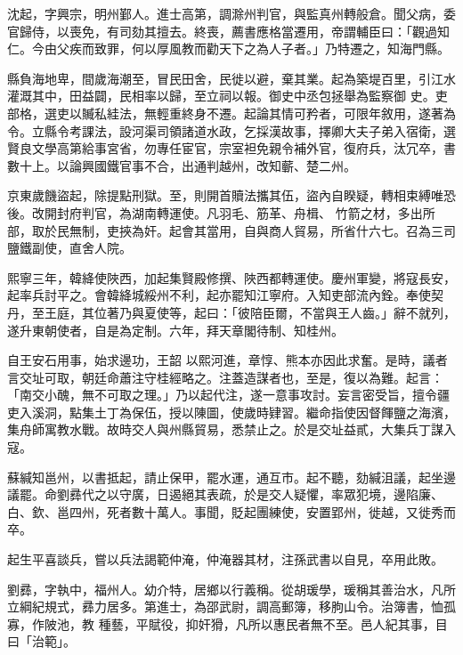 \begin{pinyinscope}
 沈起，字興宗，明州鄞人。進士高第，調滁州判官，與監真州轉般倉。聞父病，委官歸侍，以喪免，有司劾其擅去。終喪，薦書應格當遷用，帝謂輔臣曰：「觀過知仁。今由父疾而致罪，何以厚風教而勸天下之為人子者。」乃特遷之，知海門縣。



 縣負海地卑，間歲海潮至，冒民田舍，民徙以避，棄其業。起為築堤百里，引江水灌溉其中，田益闢，民相率以歸，至立祠以報。御史中丞包拯舉為監察御
 史。吏部格，選吏以贓私絓法，無輕重終身不遷。起論其情可矜者，可限年敘用，遂著為令。立縣令考課法，設河渠司領諸道水政，乞採漢故事，擇卿大夫子弟入宿衛，選賢良文學高第給事宮省，勿專任宦官，宗室袒免親令補外官，復府兵，汰冗卒，書數十上。以論興國鐵官事不合，出通判越州，改知蘄、楚二州。



 京東歲饑盜起，除提點刑獄。至，則開首贖法攜其伍，盜內自睽疑，轉相束縛唯恐後。改開封府判官，為湖南轉運使。凡羽毛、筋革、舟楫、
 竹箭之材，多出所部，取於民無制，吏挾為奸。起會其當用，自與商人貿易，所省什六七。召為三司鹽鐵副使，直舍人院。



 熙寧三年，韓絳使陜西，加起集賢殿修撰、陜西都轉運使。慶州軍變，將寇長安，起率兵討平之。會韓絳城綏州不利，起亦罷知江寧府。入知吏部流內銓。奉使契丹，至王庭，其位著乃與夏使等，起曰：「彼陪臣爾，不當與王人齒。」辭不就列，遂升東朝使者，自是為定制。六年，拜天章閣待制、知桂州。



 自王安石用事，始求邊功，王韶
 以熙河進，章惇、熊本亦因此求奮。是時，議者言交址可取，朝廷命蕭注守桂經略之。注蓋造謀者也，至是，復以為難。起言：「南交小醜，無不可取之理。」乃以起代注，遂一意事攻討。妄言密受旨，擅令疆吏入溪洞，點集土丁為保伍，授以陳圖，使歲時肄習。繼命指使因督餫鹽之海濱，集舟師寓教水戰。故時交人與州縣貿易，悉禁止之。於是交址益貳，大集兵丁謀入寇。



 蘇緘知邕州，以書抵起，請止保甲，罷水運，通互市。起不聽，劾緘沮議，起坐邊
 議罷。命劉彞代之以守廣，日遏絕其表疏，於是交人疑懼，率眾犯境，邊陷廉、白、欽、邕四州，死者數十萬人。事聞，貶起團練使，安置郢州，徙越，又徙秀而卒。



 起生平喜談兵，嘗以兵法謁範仲淹，仲淹器其材，注孫武書以自見，卒用此敗。



 劉彞，字執中，福州人。幼介特，居鄉以行義稱。從胡瑗學，瑗稱其善治水，凡所立綱紀規式，彞力居多。第進士，為邵武尉，調高郵簿，移朐山令。治簿書，恤孤寡，作陂池，教
 種藝，平賦役，抑奸猾，凡所以惠民者無不至。邑人紀其事，目曰「治範」。




\end{pinyinscope}

